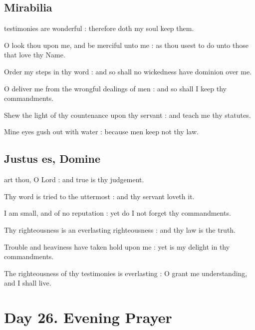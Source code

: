 \subsection{Mirabilia}
 testimonies are wonderful : therefore doth my soul keep them.\par
{}
O look thou upon me, and be merciful unto me : as thou usest to do unto those that love thy Name.\par
{}Order my steps in thy word : and so shall no wickedness have dominion over me.\par
{}O deliver me from the wrongful dealings of men : and so shall I keep thy commandments.\par
{}Shew the light of thy countenance upon thy servant : and teach me thy statutes.\par
{}Mine eyes gush out with water : because men keep not thy law.\par

\subsection{Justus es, Domine}
 art thou, O Lord : and true is thy judgement.\par
{}
Thy word is tried to the uttermost : and thy servant loveth it.\par
{}I am small, and of no reputation : yet do I not forget thy commandments.\par
{}Thy righteousness is an everlasting righteousness : and thy law is the truth.\par
{}Trouble and heaviness have taken hold upon me : yet is my delight in thy commandments.\par
{}The righteousness of thy testimonies is everlasting : O grant me understanding, and I shall live.\par

\section*{Day 26. Evening Prayer}

